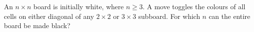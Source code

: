 An $n\times n$ board is initially white, where $n\ge3$. A move toggles the colours of all cells on either diagonal of any $2\times2$ or $3\times3$ subboard. For which $n$ can the entire board be made black?
